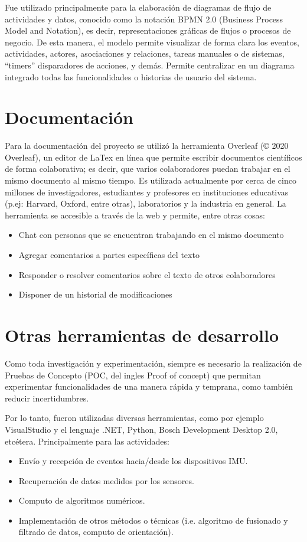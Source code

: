 Fue utilizado principalmente para la elaboración de diagramas de flujo de actividades y datos, conocido como la notación BPMN 2.0 (Business Process Model and Notation), es decir, representaciones gráficas de flujos o procesos de negocio. De esta manera, el modelo permite visualizar de forma clara los eventos, actividades, actores, asociaciones y relaciones, tareas manuales o de sistemas, ``timers'' disparadores de acciones, y demás. Permite centralizar en un diagrama integrado todas las funcionalidades o historias de usuario del sistema.

\section{Documentación} 

Para la documentación del proyecto se utilizó la herramienta Overleaf (© 2020 Overleaf), un editor de LaTex en línea que permite escribir documentos científicos de forma colaborativa; es decir, que varios colaboradores puedan trabajar en el mismo documento al mismo tiempo. Es utilizada actualmente por cerca de cinco millones de investigadores, estudiantes y profesores en instituciones educativas (p.ej: Harvard, Oxford, entre otras), laboratorios y la industria en general. La herramienta se accesible a través de la web y permite, entre otras cosas:

\begin{itemize}
    \item Chat con personas que se encuentran trabajando en el mismo documento 
    \item Agregar comentarios a partes específicas del texto 
    \item Responder o resolver comentarios sobre el texto de otros colaboradores 
    \item Disponer de un historial de modificaciones 
\end{itemize} 

\section{Otras herramientas de desarrollo}

Como toda investigación y experimentación, siempre es necesario la realización de Pruebas de Concepto (POC, del ingles Proof of concept) que permitan experimentar funcionalidades de una manera rápida y temprana, como también reducir incertidumbres.

Por lo tanto, fueron utilizadas diversas herramientas, como por ejemplo VisualStudio y el lenguaje .NET, Python, Bosch Development Desktop 2.0, etcétera. Principalmente para las actividades:

\begin{itemize}
    \item Envío y recepción de eventos hacia/desde los dispositivos IMU.
    \item Recuperación de datos medidos por los sensores.
    \item Computo de algoritmos numéricos.
    \item Implementación de otros métodos o técnicas (i.e. algoritmo de fusionado y filtrado de datos, computo de orientación).
\end{itemize}
